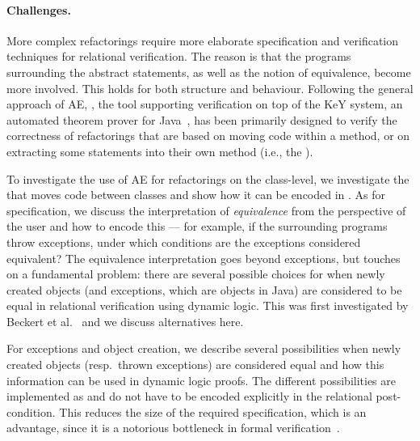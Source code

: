 \paragraph{Challenges.}
More complex refactorings require more elaborate specification and verification techniques for relational verification. 
The reason is that the programs surrounding the abstract statements, as well as the notion of equivalence, become more involved.
This holds for both structure and behaviour.
Following the general approach of AE, \Refinity{} \cite{steinhoefel:ae}, the tool supporting verification on top of the KeY system, an automated theorem prover for Java~\cite{DBLP:conf/aplas/Steinhofel20},
has been primarily designed to verify the correctness of refactorings that are based on moving code within a method, or on extracting some statements into their own method (i.e., the ).

To investigate the use of AE for refactorings on the class-level, we investigate the  that moves code between classes and show how it can be encoded in \Refinity{}.
As for specification, we discuss the interpretation of \textit{equivalence} from the perspective of the user and how to encode this --- for example, if the surrounding programs throw exceptions, under which conditions are the exceptions considered equivalent?
The equivalence interpretation goes beyond exceptions, but touches on a fundamental problem:
there are several possible choices for when newly created objects (and exceptions, which are objects in Java) are considered to be equal in relational verification using dynamic logic.
This was first investigated by Beckert et al.~\cite{DBLP:conf/lopstr/BeckertBKSSU13} and we discuss alternatives here.


For exceptions and object creation, we describe several possibilities when newly created objects (resp.\ thrown exceptions) are considered equal
and how this information can be used in dynamic logic proofs. The different possibilities are implemented as  and do not have to be encoded explicitly in the relational post-condition.
This reduces the size of the required specification, which is an advantage, since it is a notorious bottleneck in formal verification~\cite{DBLP:journals/corr/abs-1211-6186,DBLP:series/lncs/HahnleH19}.


